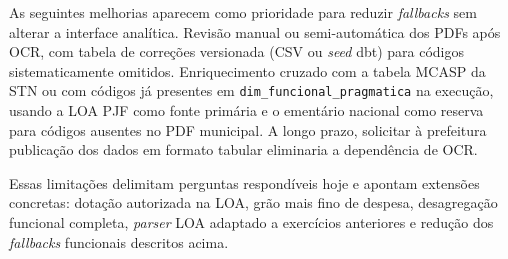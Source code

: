 As seguintes melhorias aparecem como prioridade para reduzir \textit{fallbacks} sem alterar a interface analítica. Revisão manual ou semi-automática dos PDFs após OCR, com tabela de correções versionada (CSV ou \textit{seed} dbt) para códigos sistematicamente omitidos. Enriquecimento cruzado com a tabela MCASP da STN ou com códigos já presentes em \texttt{dim\_funcional\_pragmatica} na execução, usando a LOA PJF como fonte primária e o ementário nacional como reserva para códigos ausentes no PDF municipal. A longo prazo, solicitar à prefeitura publicação dos dados em formato tabular eliminaria a dependência de OCR.

Essas limitações delimitam perguntas respondíveis hoje e apontam extensões concretas: dotação autorizada na LOA, grão mais fino de despesa, desagregação funcional completa, \textit{parser} LOA adaptado a exercícios anteriores e redução dos \textit{fallbacks} funcionais descritos acima.
